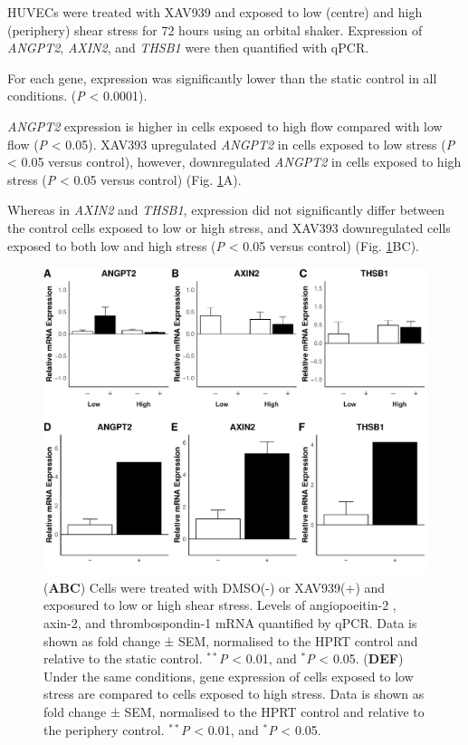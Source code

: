 \documentclass[
  12pt,
]{article}
\begin{document}
HUVECs were treated with XAV939 and exposed to low (centre) and high (periphery) shear stress for 72 hours using an orbital shaker. Expression of \emph{ANGPT2}, \emph{AXIN2}, and \emph{THSB1} were then quantified with qPCR.

For each gene, expression was significantly lower than the static control in all conditions. (\emph{P} \textless{} 0.0001).

\emph{ANGPT2} expression is higher in cells exposed to high flow compared with low flow (\emph{P} \textless{} 0.05). XAV393 upregulated \emph{ANGPT2} in cells exposed to low stress (\emph{P} \textless{} 0.05 versus control), however, downregulated \emph{ANGPT2} in cells exposed to high stress (\emph{P} \textless{} 0.05 versus control) (Fig. \ref{fig:plots}A).

Whereas in \emph{AXIN2} and \emph{THSB1}, expression did not significantly differ between the control cells exposed to low or high stress, and XAV393 downregulated cells exposed to both low and high stress (\emph{P} \textless{} 0.05 versus control) (Fig. \ref{fig:plots}BC).

\begin{figure}
\centering
\includegraphics{report_files/figure-latex/plots-1.pdf}
\caption{\label{fig:plots}(\textbf{ABC}) Cells were treated with DMSO(-) or XAV939(+) and exposured to low or high shear stress. Levels of angiopoeitin-2 , axin-2, and thrombospondin-1 mRNA quantified by qPCR. Data is shown as fold change ± SEM, normalised to the HPRT control and relative to the static control. \(^{**}\)\emph{P} \textless{} 0.01, and \(^*\)\emph{P} \textless{} 0.05. (\textbf{DEF}) Under the same conditions, gene expression of cells exposed to low stress are compared to cells exposed to high stress. Data is shown as fold change ± SEM, normalised to the HPRT control and relative to the periphery control. \(^{**}\)\emph{P} \textless{} 0.01, and \(^*\)\emph{P} \textless{} 0.05.}
\end{figure}
\end{document}
